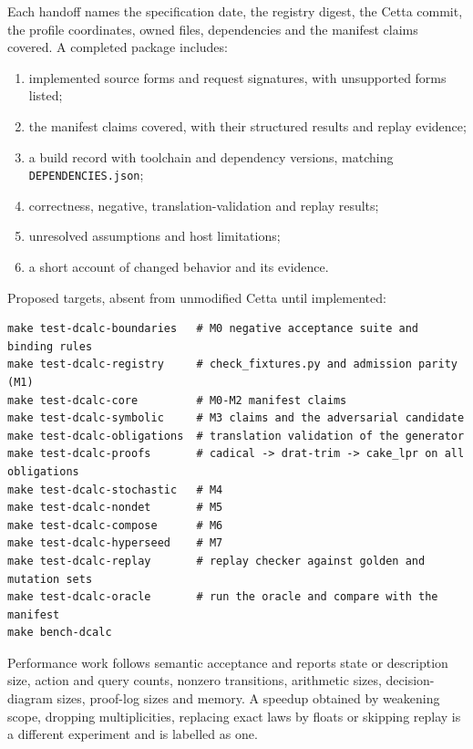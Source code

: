 \documentclass[11pt]{article}
\newcommand{\code}[1]{\texttt{#1}}
\begin{document}
Each handoff names the specification date, the registry digest, the Cetta commit, the profile
coordinates, owned files, dependencies and the manifest claims covered. A completed package includes:
\begin{enumerate}
\item implemented source forms and request signatures, with unsupported forms listed;
\item the manifest claims covered, with their structured results and replay evidence;
\item a build record with toolchain and dependency versions, matching \code{DEPENDENCIES.json};
\item correctness, negative, translation-validation and replay results;
\item unresolved assumptions and host limitations;
\item a short account of changed behavior and its evidence.
\end{enumerate}
Proposed targets, absent from unmodified Cetta until implemented:
\begin{lstlisting}
make test-dcalc-boundaries   # M0 negative acceptance suite and binding rules
make test-dcalc-registry     # check_fixtures.py and admission parity (M1)
make test-dcalc-core         # M0-M2 manifest claims
make test-dcalc-symbolic     # M3 claims and the adversarial candidate
make test-dcalc-obligations  # translation validation of the generator
make test-dcalc-proofs       # cadical -> drat-trim -> cake_lpr on all obligations
make test-dcalc-stochastic   # M4
make test-dcalc-nondet       # M5
make test-dcalc-compose      # M6
make test-dcalc-hyperseed    # M7
make test-dcalc-replay       # replay checker against golden and mutation sets
make test-dcalc-oracle       # run the oracle and compare with the manifest
make bench-dcalc
\end{lstlisting}
Performance work follows semantic acceptance and reports state or description size, action and
query counts, nonzero transitions, arithmetic sizes, decision-diagram sizes, proof-log sizes and
memory. A speedup obtained by weakening scope, dropping multiplicities, replacing exact laws by
floats or skipping replay is a different experiment and is labelled as one.
\end{document}
